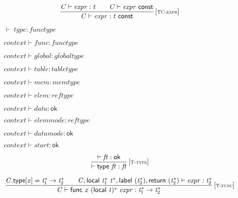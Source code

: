 $$
\begin{array}{@{}c@{}}\displaystyle
\frac{
{\mathit{C}} \vdash {\mathit{expr}} : {\mathit{t}}
 \qquad
{\mathit{C}} \vdash {\mathit{expr}}~\mathsf{const}
}{
{\mathit{C}} \vdash {\mathit{expr}} : {\mathit{t}}~\mathsf{const}
} \, {[\textsc{\scriptsize TC{-}expr}]}
\qquad
\end{array}
$$

\vspace{1ex}

$\boxed{{ \vdash }\;{\mathit{type}} : {\mathit{functype}}}$

$\boxed{{\mathit{context}} \vdash {\mathit{func}} : {\mathit{functype}}}$

$\boxed{{\mathit{context}} \vdash {\mathit{global}} : {\mathit{globaltype}}}$

$\boxed{{\mathit{context}} \vdash {\mathit{table}} : {\mathit{tabletype}}}$

$\boxed{{\mathit{context}} \vdash {\mathit{mem}} : {\mathit{memtype}}}$

$\boxed{{\mathit{context}} \vdash {\mathit{elem}} : {\mathit{reftype}}}$

$\boxed{{\mathit{context}} \vdash {\mathit{data}} : \mathsf{ok}}$

$\boxed{{\mathit{context}} \vdash {\mathit{elemmode}} : {\mathit{reftype}}}$

$\boxed{{\mathit{context}} \vdash {\mathit{datamode}} : \mathsf{ok}}$

$\boxed{{\mathit{context}} \vdash {\mathit{start}} : \mathsf{ok}}$

\vspace{1ex}

$$
\begin{array}{@{}c@{}}\displaystyle
\frac{
{ \vdash }\;{\mathit{ft}} : \mathsf{ok}
}{
{ \vdash }\;\mathsf{type}~{\mathit{ft}} : {\mathit{ft}}
} \, {[\textsc{\scriptsize T{-}type}]}
\qquad
\end{array}
$$

$$
\begin{array}{@{}c@{}}\displaystyle
\frac{
{\mathit{C}}.\mathsf{type}{}[{\mathit{x}}] = {{\mathit{t}}_{{1}}^\ast} \rightarrow {{\mathit{t}}_{{2}}^\ast}
 \qquad
{\mathit{C}}, \mathsf{local}~{{\mathit{t}}_{{1}}^\ast}~{{\mathit{t}}^\ast}, \mathsf{label}~({{\mathit{t}}_{{2}}^\ast}), \mathsf{return}~({{\mathit{t}}_{{2}}^\ast}) \vdash {\mathit{expr}} : {{\mathit{t}}_{{2}}^\ast}
}{
{\mathit{C}} \vdash \mathsf{func}~{\mathit{x}}~{(\mathsf{local}~{\mathit{t}})^\ast}~{\mathit{expr}} : {{\mathit{t}}_{{1}}^\ast} \rightarrow {{\mathit{t}}_{{2}}^\ast}
} \, {[\textsc{\scriptsize T{-}func}]}
\qquad
\end{array}
$$

